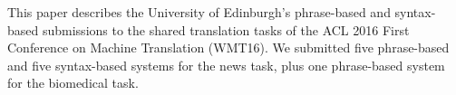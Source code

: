 This paper describes the University of Edinburgh's phrase-based and syntax-based submissions to the shared translation tasks of the ACL 2016 First Conference on Machine Translation (WMT16). We submitted five phrase-based and five syntax-based systems for the news task, plus one phrase-based system for the biomedical task.

